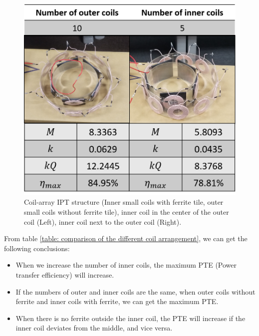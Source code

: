 \begin{figure}[!t]
    \centering
    \includegraphics[width=0.6\linewidth]{images/4_coil_6_10_inner_with_ferrite.png}
    \caption{Coil-array IPT structure (Inner small coils with ferrite tile, outer small coils without ferrite tile), inner coil in the center of the outer coil (Left), inner coil next to the outer coil (Right).}
\end{figure}

From table \ref{table: comparison of the different coil arrangement}, we can get the following conclusions:
\begin{itemize}
    \item When we increase the number of inner coils, the maximum PTE (Power transfer efficiency) will increase.
    \item If the numbers of outer and inner coils are the same, when outer coils without ferrite and inner coils with ferrite, we can get the maximum PTE.
    \item When there is no ferrite outside the inner coil, the PTE will increase if the inner coil deviates from the middle, and vice versa.
\end{itemize}

